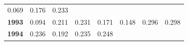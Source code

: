 \documentclass[]{article}
\begin{document}
\begin{longtable}[]{@{}rrrrrrrr@{}}
\begin{minipage}[t]{0.09\columnwidth}
0.069\strut
\end{minipage} & \begin{minipage}[t]{0.08\columnwidth}\raggedleft\strut
0.176\strut
\end{minipage} & \begin{minipage}[t]{0.10\columnwidth}\raggedleft\strut
0.233\strut
\end{minipage}\tabularnewline
\begin{minipage}[t]{0.08\columnwidth}\raggedleft\strut
\textbf{1993}\strut
\end{minipage} & \begin{minipage}[t]{0.10\columnwidth}\raggedleft\strut
0.094\strut
\end{minipage} & \begin{minipage}[t]{0.11\columnwidth}\raggedleft\strut
0.211\strut
\end{minipage} & \begin{minipage}[t]{0.08\columnwidth}\raggedleft\strut
0.231\strut
\end{minipage} & \begin{minipage}[t]{0.14\columnwidth}\raggedleft\strut
0.171\strut
\end{minipage} & \begin{minipage}[t]{0.09\columnwidth}\raggedleft\strut
0.148\strut
\end{minipage} & \begin{minipage}[t]{0.08\columnwidth}\raggedleft\strut
0.296\strut
\end{minipage} & \begin{minipage}[t]{0.10\columnwidth}\raggedleft\strut
0.298\strut
\end{minipage}\tabularnewline
\begin{minipage}[t]{0.08\columnwidth}\raggedleft\strut
\textbf{1994}\strut
\end{minipage} & \begin{minipage}[t]{0.10\columnwidth}\raggedleft\strut
0.236\strut
\end{minipage} & \begin{minipage}[t]{0.11\columnwidth}\raggedleft\strut
0.192\strut
\end{minipage} & \begin{minipage}[t]{0.08\columnwidth}\raggedleft\strut
0.235\strut
\end{minipage} & \begin{minipage}[t]{0.14\columnwidth}\raggedleft\strut
0.248\strut
\end{minipage} & \begin{minipage}[t]{0.09\columnwidth}\raggedleft\strut

\end{minipage}
\end{longtable}
\end{document}
